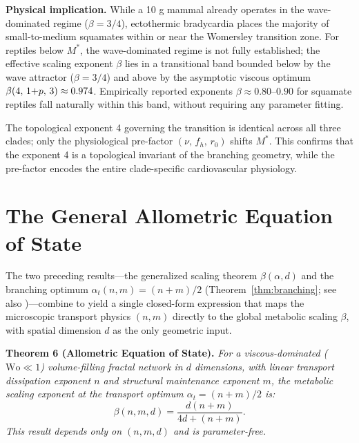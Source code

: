 \documentclass[11pt,a4paper]{article}
\theoremstyle{remark}
\newcounter{manualthm}
\begin{document}
\textbf{Physical implication.} While a 10 g mammal already operates in the
wave-dominated regime ($\beta = 3/4$), ectothermic bradycardia places the
majority of small-to-medium squamates within or near the Womersley
transition zone. For reptiles below $M^*$, the wave-dominated regime is
not fully established; the effective scaling exponent $\beta$ lies in a
transitional band bounded below by the wave attractor ($\beta = 3/4$) and
above by the asymptotic viscous optimum
$\beta(4,\,1{+}p,\,3) \approx 0.974{}$.
Empirically reported exponents $\beta \approx 0.80$--$0.90$ for squamate
reptiles fall naturally within this band, without requiring any parameter
fitting.

The topological exponent 4 governing the transition is identical across all
three clades; only the physiological pre-factor
$(\nu,\,f_h,\,r_0)$ shifts $M^*$. This confirms that the exponent 4 is a
topological invariant of the branching geometry, while the pre-factor
encodes the entire clade-specific cardiovascular physiology.

\section{The General Allometric Equation of State}

The two preceding results---the generalized scaling theorem $\beta(\alpha, d)$
and the branching optimum $\alpha_t(n,m) = (n+m)/2$ (Theorem~\ref{thm:branching}; see also \cite{bennett2025, paperII})---combine to yield a
single closed-form expression that maps the microscopic transport physics
$(n,m)$ directly to the global metabolic scaling $\beta$, with spatial dimension
$d$ as the only geometric input.

\vspace{0.5em}
\noindent \textbf{Theorem 6 (Allometric Equation of State).}\label{thm:eos} \textit{For a viscous-dominated ($\mathrm{Wo} \ll 1$) volume-filling fractal network in $d$ dimensions, with linear transport dissipation exponent $n$ and structural maintenance exponent $m$, the metabolic scaling exponent at the transport optimum $\alpha_t = (n+m)/2$ is:}
\begin{equation}
\boxed{\beta(n, m, d) = \frac{d(n+m)}{4d + (n+m)}.}
\end{equation}
\textit{This result depends only on $(n, m, d)$ and is parameter-free.}
\end{document}
